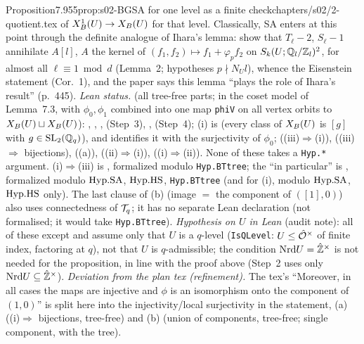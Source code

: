 \begin{quoted}{Proposition}{7.9}{55}{prop:s02-BG}{SA for one level as a finite check}{chapters/s02/2-quotient.tex}
of $X^1_B(U)\to X_B(U)$ for that level. Classically, SA enters at this point through the definite analogue of Ihara's lemma:
\cite[Lemma~2 and Cor.~1, pp.~445--446]{DT} show that $T_\ell-2$, $S_\ell-1$ annihilate $A[l]$, $A$ the kernel of
$(f_1,f_2)\mapsto f_1+\varphi_pf_2$ on $S_k(U;\mathbb{Q}_l/\mathbb{Z}_l)^2$, for almost all $\ell\equiv1\bmod d$ (Lemma~2; hypotheses $p\nmid N_U l$), whence the Eisenstein statement (Cor.~1), and the paper says this lemma ``plays the role of Ihara's result'' (p.~445).
\emph{Lean status.} \stformal{} (all tree-free parts; in the coset model of Lemma~7.3, with $\phi_0,\phi_1$ combined
into one map \texttt{phiV} on all vertex orbits to $X_B(U)\sqcup X_B(U)$):
, ,
,  (Step~3),
,  (Step~4);
(i) is  (every class of $X_B(U)$ is $[g]$ with $g\in\mathrm{SL}_2(\mathbb{Q}_q)$), and
 identifies it with the surjectivity of $\phi_0$;
 ((iii)$\Rightarrow$(i)),
 ((iii)$\Rightarrow$ bijections),
 ((a)),  ((ii)$\Rightarrow$(i)),
 ((i)$\Rightarrow$(ii)). None of these takes a \texttt{Hyp.*} argument.
(i)$\Rightarrow$(iii) is , formalized modulo \texttt{Hyp.BTtree}; the ``in particular''
is , formalized modulo $\mathrm{Hyp.SA}$, $\mathrm{Hyp.HS}$, \texttt{Hyp.BTtree} (and
 for (i), modulo $\mathrm{Hyp.SA}$, $\mathrm{Hyp.HS}$ only). The last clause of (b) (image $=$ the
component of $([1],0)$) also uses connectedness of $\mathcal{T}_q$; it has no separate Lean declaration (not formalised; it would take
\texttt{Hyp.BTtree}).
\emph{Hypothesis on $U$ in Lean} (audit note): all of these except  and 
assume only that $U$ is a $q$-level (\texttt{IsQLevel}: $U\le\hat{\mathcal{O}}^\times$ of finite index, factoring at $q$), not that $U$ is
$q$-admissible; the condition $\mathrm{Nrd} U=\hat{\mathbb{Z}}^\times$ is not needed for the proposition, in line with the proof above (Step~2 uses only
$\mathrm{Nrd} U\subseteq\hat{\mathbb{Z}}^\times$).
\emph{Deviation from the plan tex (refinement).} The tex's ``Moreover, in all cases the maps are injective and $\phi$ is an isomorphism
onto the component of $(1,0)$'' is split here into the injectivity/local surjectivity in the statement, (a) ((i)$\Rightarrow$ bijections,
tree-free) and (b) (union of components, tree-free; single component, with the tree).
\end{quoted}
